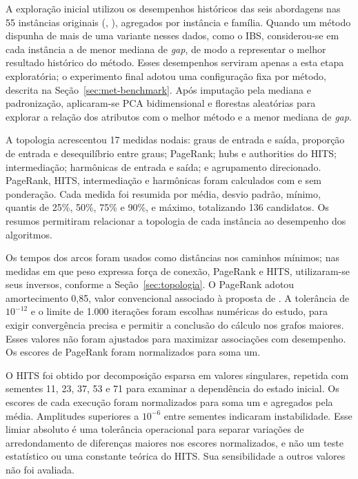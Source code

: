 A exploração inicial utilizou os desempenhos históricos das seis abordagens
nas 55 instâncias originais
(\citeauthor{DelazeriRitt2024}, \citeyear{DelazeriRitt2024,DelazeriRitt2026}),
agregados por instância e família. Quando um método dispunha de mais de uma
variante nesses dados, como o IBS, considerou-se em cada instância a de menor
mediana de \textit{gap}, de modo a representar o melhor resultado histórico
do método. Esses desempenhos serviram apenas a esta etapa exploratória; o
experimento final adotou uma configuração fixa por método, descrita na
Seção~\ref{sec:met-benchmark}. Após imputação pela mediana e padronização,
aplicaram-se PCA bidimensional e florestas aleatórias para explorar a relação
dos atributos com o melhor método e a menor mediana de \textit{gap}.

A topologia acrescentou 17 medidas nodais: graus de entrada e saída,
proporção de entrada e desequilíbrio entre graus; PageRank; hubs e
authorities do HITS; intermediação; harmônicas de entrada e saída;
e agrupamento direcionado. PageRank, HITS, intermediação e harmônicas
foram calculados com e sem ponderação. Cada medida foi resumida por
média, desvio padrão, mínimo, quantis de 25\%, 50\%, 75\% e 90\%,
e máximo, totalizando 136 candidatos. Os resumos permitiram relacionar
a topologia de cada instância ao desempenho dos algoritmos.

Os tempos dos arcos foram usados como distâncias nos caminhos mínimos;
nas medidas em que peso expressa força de conexão, PageRank e HITS,
utilizaram-se seus inversos, conforme a Seção~\ref{sec:topologia}.
O PageRank adotou amortecimento 0,85, valor convencional associado à
proposta de . A tolerância de $10^{-12}$ e o
limite de 1.000 iterações foram escolhas numéricas do estudo, para exigir
convergência precisa e permitir a conclusão do cálculo nos grafos maiores.
Esses valores não foram ajustados para maximizar associações com desempenho.
Os escores de PageRank foram normalizados para soma um.

O HITS foi obtido por decomposição esparsa em valores singulares, repetida
com sementes 11, 23, 37, 53 e 71 para examinar a dependência do estado inicial.
Os escores de cada execução foram normalizados para soma um e agregados
pela média. Amplitudes superiores a $10^{-6}$ entre sementes indicaram
instabilidade. Esse limiar absoluto é uma tolerância operacional para
separar variações de arredondamento de diferenças maiores nos escores
normalizados, e não um teste estatístico ou uma constante teórica do HITS.
Sua sensibilidade a outros valores não foi avaliada.

